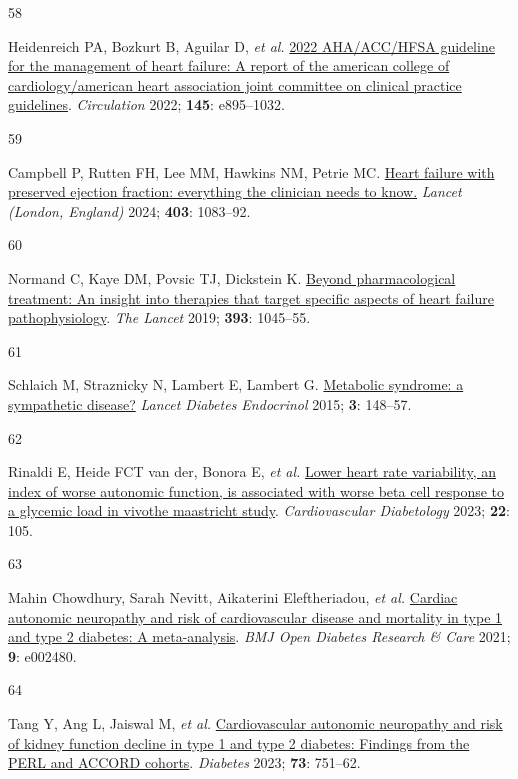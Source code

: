 \documentclass[
  a4paper,
  headsepline=true,
  open=any]{scrbook}
\newlength{\cslhangindent}
\newlength{\csllabelwidth}
\newlength{\cslentryspacingunit} %
\newenvironment{CSLReferences}[2] %
 {%
  \setlength{\parindent}{0pt}
  \ifodd #1
  \let\oldpar\par
  \def\par{\hangindent=\cslhangindent\oldpar}
  \fi
  \setlength{\parskip}{#2\cslentryspacingunit}
 }%
 {}
\newcommand{\CSLLeftMargin}[1]{\parbox[t]{\csllabelwidth}{#1}}
\newcommand{\CSLRightInline}[1]{\parbox[t]{\linewidth - \csllabelwidth}{#1}\break}
\begin{document}
\begin{CSLReferences}{0}{0}
\leavevmode{}%
\CSLLeftMargin{58 }%
\CSLRightInline{Heidenreich PA, Bozkurt B, Aguilar D, \emph{et al.}
\href{https://doi.org/10.1161/CIR.0000000000001063}{2022 AHA/ACC/HFSA
guideline for the management of heart failure: A report of the american
college of cardiology/american heart association joint committee on
clinical practice guidelines}. \emph{Circulation} 2022; \textbf{145}:
e895--1032.}

\leavevmode{}%
\CSLLeftMargin{59 }%
\CSLRightInline{Campbell P, Rutten FH, Lee MM, Hawkins NM, Petrie MC.
\href{https://doi.org/10.1016/S0140-6736(23)02756-3}{Heart failure with
preserved ejection fraction: everything the clinician needs to know.}
\emph{Lancet (London, England)} 2024; \textbf{403}: 1083--92.}

\leavevmode{}%
\CSLLeftMargin{60 }%
\CSLRightInline{Normand C, Kaye DM, Povsic TJ, Dickstein K.
\href{https://doi.org/10.1016/S0140-6736(18)32216-5}{Beyond
pharmacological treatment: An insight into therapies that target
specific aspects of heart failure pathophysiology}. \emph{The Lancet}
2019; \textbf{393}: 1045--55.}

\leavevmode{}%
\CSLLeftMargin{61 }%
\CSLRightInline{Schlaich M, Straznicky N, Lambert E, Lambert G.
\href{https://doi.org/10.1016/s2213-8587(14)70033-6}{Metabolic syndrome:
a sympathetic disease?} \emph{Lancet Diabetes Endocrinol} 2015;
\textbf{3}: 148--57.}

\leavevmode{}%
\CSLLeftMargin{62 }%
\CSLRightInline{Rinaldi E, Heide FCT van der, Bonora E, \emph{et al.}
\href{https://doi.org/10.1186/s12933-023-01837-0}{Lower heart rate
variability, an index of worse autonomic function, is associated with
worse beta cell response to a glycemic load in vivo{\textemdash}the
maastricht study}. \emph{Cardiovascular Diabetology} 2023; \textbf{22}:
105.}

\leavevmode{}%
\CSLLeftMargin{63 }%
\CSLRightInline{Mahin Chowdhury, Sarah Nevitt, Aikaterini Eleftheriadou,
\emph{et al.} \href{https://doi.org/10.1136/bmjdrc-2021-002480}{Cardiac
autonomic neuropathy and risk of cardiovascular disease and mortality in
type 1 and type 2 diabetes: A meta-analysis}. \emph{BMJ Open Diabetes
Research \& Care} 2021; \textbf{9}: e002480.}

\leavevmode{}%
\CSLLeftMargin{64 }%
\CSLRightInline{Tang Y, Ang L, Jaiswal M, \emph{et al.}
\href{https://doi.org/10.2337/db23-0247}{Cardiovascular autonomic
neuropathy and risk of kidney function decline in type 1 and type 2
diabetes: Findings from the PERL and ACCORD cohorts}. \emph{Diabetes}
2023; \textbf{73}: 751--62.}


\end{CSLReferences}
\end{document}
